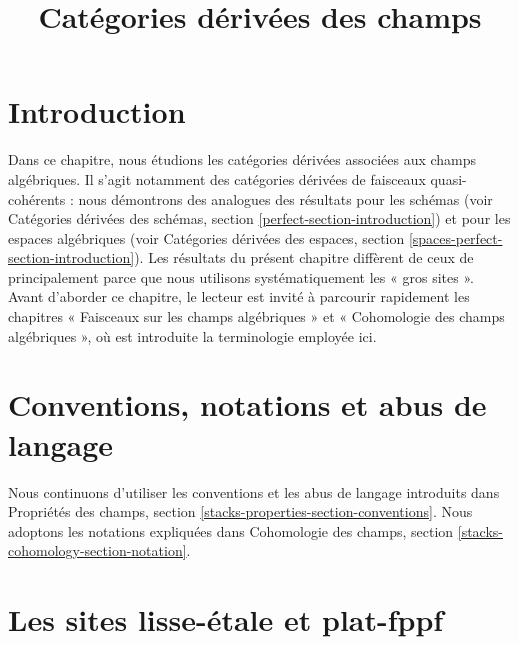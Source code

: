 

%


\title{Catégories dérivées des champs}

\maketitle

\label{section-phantom}

\tableofcontents




\section{Introduction}
\label{section-introduction}

\noindent
Dans ce chapitre, nous étudions les catégories dérivées associées aux champs
algébriques. Il s'agit notamment des catégories dérivées de faisceaux
quasi-cohérents : nous démontrons des analogues des résultats pour les schémas
(voir Catégories dérivées des schémas, section
\ref{perfect-section-introduction}) et pour les espaces algébriques (voir
Catégories dérivées des espaces, section
\ref{spaces-perfect-section-introduction}). Les résultats du présent chapitre
diffèrent de ceux de \cite{LM-B} principalement parce que nous utilisons
systématiquement les « gros sites ». Avant d'aborder ce chapitre, le lecteur
est invité à parcourir rapidement les chapitres « Faisceaux sur les champs
algébriques » et « Cohomologie des champs algébriques », où est introduite la
terminologie employée ici.



\section{Conventions, notations et abus de langage}
\label{section-conventions}

\noindent
Nous continuons d'utiliser les conventions et les abus de langage introduits
dans Propriétés des champs, section
\ref{stacks-properties-section-conventions}. Nous adoptons les notations
expliquées dans Cohomologie des champs, section
\ref{stacks-cohomology-section-notation}.












\section{Les sites lisse-\'etale et plat-fppf}
\label{section-lisse-etale}

